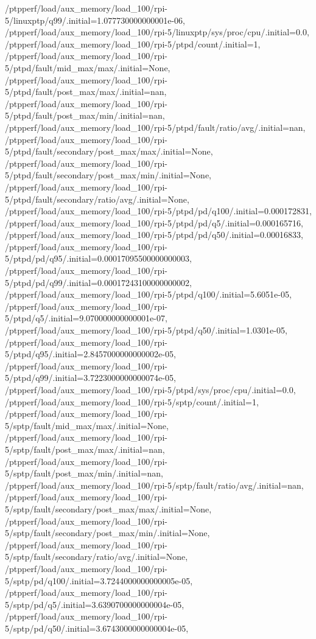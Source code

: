 {    /ptpperf/load/aux_memory/load_100/rpi-5/linuxptp/q99/.initial=1.077730000000001e-06,
    /ptpperf/load/aux_memory/load_100/rpi-5/linuxptp/sys/proc/cpu/.initial=0.0,
    /ptpperf/load/aux_memory/load_100/rpi-5/ptpd/count/.initial=1,
    /ptpperf/load/aux_memory/load_100/rpi-5/ptpd/fault/mid_max/max/.initial=None,
    /ptpperf/load/aux_memory/load_100/rpi-5/ptpd/fault/post_max/max/.initial=nan,
    /ptpperf/load/aux_memory/load_100/rpi-5/ptpd/fault/post_max/min/.initial=nan,
    /ptpperf/load/aux_memory/load_100/rpi-5/ptpd/fault/ratio/avg/.initial=nan,
    /ptpperf/load/aux_memory/load_100/rpi-5/ptpd/fault/secondary/post_max/max/.initial=None,
    /ptpperf/load/aux_memory/load_100/rpi-5/ptpd/fault/secondary/post_max/min/.initial=None,
    /ptpperf/load/aux_memory/load_100/rpi-5/ptpd/fault/secondary/ratio/avg/.initial=None,
    /ptpperf/load/aux_memory/load_100/rpi-5/ptpd/pd/q100/.initial=0.000172831,
    /ptpperf/load/aux_memory/load_100/rpi-5/ptpd/pd/q5/.initial=0.000165716,
    /ptpperf/load/aux_memory/load_100/rpi-5/ptpd/pd/q50/.initial=0.00016833,
    /ptpperf/load/aux_memory/load_100/rpi-5/ptpd/pd/q95/.initial=0.00017095500000000003,
    /ptpperf/load/aux_memory/load_100/rpi-5/ptpd/pd/q99/.initial=0.00017243100000000002,
    /ptpperf/load/aux_memory/load_100/rpi-5/ptpd/q100/.initial=5.6051e-05,
    /ptpperf/load/aux_memory/load_100/rpi-5/ptpd/q5/.initial=9.070000000000001e-07,
    /ptpperf/load/aux_memory/load_100/rpi-5/ptpd/q50/.initial=1.0301e-05,
    /ptpperf/load/aux_memory/load_100/rpi-5/ptpd/q95/.initial=2.8457000000000002e-05,
    /ptpperf/load/aux_memory/load_100/rpi-5/ptpd/q99/.initial=3.7223000000000074e-05,
    /ptpperf/load/aux_memory/load_100/rpi-5/ptpd/sys/proc/cpu/.initial=0.0,
    /ptpperf/load/aux_memory/load_100/rpi-5/sptp/count/.initial=1,
    /ptpperf/load/aux_memory/load_100/rpi-5/sptp/fault/mid_max/max/.initial=None,
    /ptpperf/load/aux_memory/load_100/rpi-5/sptp/fault/post_max/max/.initial=nan,
    /ptpperf/load/aux_memory/load_100/rpi-5/sptp/fault/post_max/min/.initial=nan,
    /ptpperf/load/aux_memory/load_100/rpi-5/sptp/fault/ratio/avg/.initial=nan,
    /ptpperf/load/aux_memory/load_100/rpi-5/sptp/fault/secondary/post_max/max/.initial=None,
    /ptpperf/load/aux_memory/load_100/rpi-5/sptp/fault/secondary/post_max/min/.initial=None,
    /ptpperf/load/aux_memory/load_100/rpi-5/sptp/fault/secondary/ratio/avg/.initial=None,
    /ptpperf/load/aux_memory/load_100/rpi-5/sptp/pd/q100/.initial=3.7244000000000005e-05,
    /ptpperf/load/aux_memory/load_100/rpi-5/sptp/pd/q5/.initial=3.6390700000000004e-05,
    /ptpperf/load/aux_memory/load_100/rpi-5/sptp/pd/q50/.initial=3.6743000000000004e-05,
}

